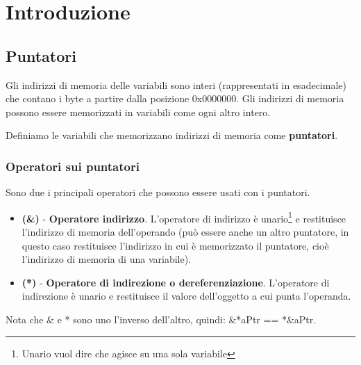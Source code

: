 \section{Introduzione}
\subsection{Puntatori}
Gli indirizzi di memoria delle variabili sono interi (rappresentati in esadecimale) che contano i byte a partire dalla posizione 0x0000000. Gli indirizzi di memoria possono essere memorizzati in variabili come ogni altro intero.
\begin{definition}[Puntatori]
Definiamo le variabili che memorizzano indirizzi di memoria come \textbf{puntatori}.
\end{definition}
\subsubsection{Operatori sui puntatori}
Sono due i principali operatori che possono essere usati con i puntatori.
\begin{itemize}
    \item \textbf{(\&)} \hspace{.1cm} - \hspace{.1cm} \textbf{Operatore indirizzo}. L'operatore di indirizzo è unario\footnote{Unario vuol dire che agisce su una sola variabile} e restituisce l'indirizzo di memoria dell'operando (può essere anche un altro puntatore, in questo caso restituisce l'indirizzo in cui è memorizzato il puntatore, cioè l'indirizzo di memoria di una variabile).
    \item \textbf{(*)} \hspace{.1cm} - \hspace{.1cm} \textbf{Operatore di indirezione o dereferenziazione}. L'operatore di indirezione è unario e restituisce il valore dell'oggetto a cui punta l'operanda. 
\end{itemize}

\begin{note}
Nota che \& e * sono uno l'inverso dell'altro, quindi: \&*aPtr == *\&aPtr.
\end{note}

